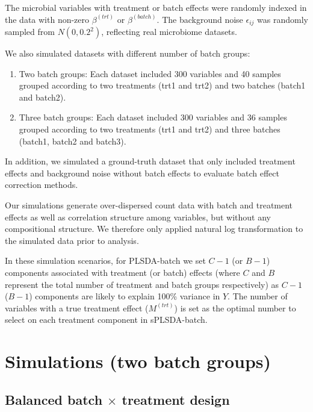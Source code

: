 \documentclass[
]{book}
\providecommand{\tightlist}{%
  \setlength{\itemsep}{0pt}\setlength{\parskip}{0pt}}
\begin{document}
\normalsize

The microbial variables with treatment or batch effects were randomly indexed in the data with non-zero \(\beta^{(trt)}\) or \(\beta^{(batch)}\). The background noise \(\epsilon_{ij}\) was randomly sampled from \(N(0,0.2^{2})\), reflecting real microbiome datasets.

We also simulated datasets with different number of batch groups:

\begin{enumerate}
\def\labelenumi{\arabic{enumi}.}
\tightlist
\item
  Two batch groups: Each dataset included 300 variables and 40 samples grouped according to two treatments (trt1 and trt2) and two batches (batch1 and batch2).\\
\item
  Three batch groups: Each dataset included 300 variables and 36 samples grouped according to two treatments (trt1 and trt2) and three batches (batch1, batch2 and batch3).
\end{enumerate}

In addition, we simulated a ground-truth dataset that only included treatment effects and background noise without batch effects to evaluate batch effect correction methods.

Our simulations generate over-dispersed count data with batch and treatment effects as well as correlation structure among variables, but without any compositional structure. We therefore only applied natural log transformation to the simulated data prior to analysis.

In these simulation scenarios, for PLSDA-batch we set \(C-1\) (or \(B-1\)) components associated with treatment (or batch) effects (where \(C\) and \(B\) represent the total number of treatment and batch groups respectively) as \(C-1\) (\(B-1\)) components are likely to explain 100\% variance in \(Y\). The number of variables with a true treatment effect (\(M^{(trt)}\)) is set as the optimal number to select on each treatment component in sPLSDA-batch.

\hypertarget{simulations-two-batch-groups}{%
\section{Simulations (two batch groups)}\label{simulations-two-batch-groups}}

\hypertarget{balanced-batch-times-treatment-design-1}{%
\subsection{\texorpdfstring{Balanced batch \(\times\) treatment design}{Balanced batch \textbackslash times treatment design}}\label{balanced-batch-times-treatment-design-1}}
\end{document}
